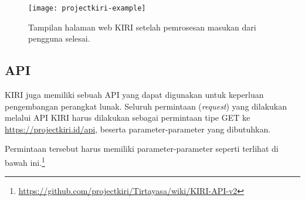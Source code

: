 \begin{figure}[ht]
    \centering
    \texttt{[image: projectkiri-example]}
    \caption[Tampilan akhir halaman web KIRI]{Tampilan halaman web KIRI setelah pemrosesan masukan dari pengguna selesai.}
    \label{fig:kiri-example}
\end{figure}

\subsection{API}
\label{sec:kiri-api}

KIRI juga memiliki sebuah API yang dapat digunakan untuk keperluan pengembangan perangkat lunak. Seluruh permintaan (\textit{request}) yang dilakukan melalui API KIRI harus dilakukan sebagai permintaan tipe GET ke \href{https://projectkiri.id/api}{https://projectkiri.id/api}, beserta parameter-parameter yang dibutuhkan. 

Permintaan tersebut harus memiliki parameter-parameter seperti terlihat di bawah ini.\footnote{\href{https://github.com/projectkiri/Tirtayasa/wiki/KIRI-API-v2}{https://github.com/projectkiri/Tirtayasa/wiki/KIRI-API-v2}}

